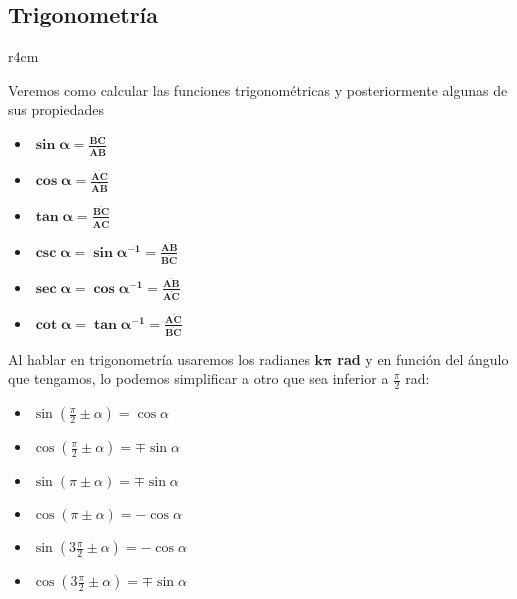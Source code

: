 \subsection{Trigonometría}
\begin{wrapfigure}{r}{4cm}
        \vspace{1cm}
        \hspace{-4cm}
\end{wrapfigure}
\noindent Veremos como calcular las funciones trigonométricas y posteriormente algunas de sus propiedades
\begin{itemize}
        \item \(\bm{\sin{\bm{\alpha}} = \frac{\overline{BC}}{\overline{AB}}}\)
        \item \(\bm{\cos{\bm{\alpha}} = \frac{\overline{AC}}{\overline{AB}}}\)
        \item \(\bm{\tan{\bm{\alpha}} = \frac{\overline{BC}}{\overline{AC}}}\)
        \item \(\bm{\csc{\bm{\alpha}} = \sin{\bm{\alpha}}^{-1}=\frac{\overline{AB}}{\overline{BC}}}\)
        \item \(\bm{\sec{\bm{\alpha}} = \cos{\bm{\alpha}}^{-1}=\frac{\overline{AB}}{\overline{AC}}}\)
        \item \(\bm{\cot{\bm{\alpha}} = \tan{\bm{\alpha}}^{-1}=\frac{\overline{AC}}{\overline{BC}}}\)
\end{itemize}
Al hablar en trigonometría usaremos los radianes \(\bm{k\pi}\) \textbf{rad} y en función del ángulo que tengamos, lo podemos simplificar a otro que sea inferior a \(\frac{\pi}{2}\) rad:
\begin{itemize}
        \item {\boldmath \(\sin{(\frac{\pi}{2} \pm \alpha)} = \cos{\alpha}\)}
        \item {\boldmath \(\cos{(\frac{\pi}{2} \pm \alpha)} = \mp\sin{\alpha}\)}
        \item {\boldmath \(\sin{(\pi \pm \alpha)} = \mp\sin{\alpha}\)}
        \item {\boldmath \(\cos{(\pi \pm \alpha)} = -\cos{\alpha}\)}
        \item {\boldmath \(\sin{(3\frac{\pi}{2} \pm \alpha)} = -\cos{\alpha}\)}
        \item {\boldmath \(\cos{(3\frac{\pi}{2} \pm \alpha)} = \mp\sin{\alpha}\)}
\end{itemize}

